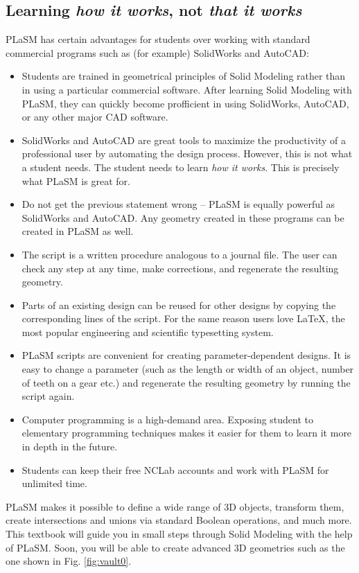 \documentclass{article}
\begin{document}
\subsection{Learning {\em how it works}, not {\em that it works}}
PLaSM has certain advantages for students over 
working with standard commercial programs such as (for example) 
SolidWorks and AutoCAD:

\begin{itemize}
\item Students are trained in geometrical principles of Solid Modeling rather 
      than in using a particular commercial software. After learning Solid 
      Modeling with PLaSM, they can quickly become profficient in using SolidWorks, 
      AutoCAD, or any other major CAD software.
\item SolidWorks and AutoCAD are great tools to maximize the productivity 
      of a professional user by automating the design process. However, this is not what a student needs. 
      The student needs to learn {\em how it works}. This is precisely what PLaSM is great for.
\item Do not get the previous statement wrong -- PLaSM is equally powerful as SolidWorks and AutoCAD. Any geometry 
      created in these programs can be created in PLaSM as well. 
\item The script is a written procedure analogous to a journal file. The user can 
      check any step at any time, make corrections, and regenerate the resulting 
      geometry.
\item Parts of an existing design can be reused for other designs by copying the 
      corresponding lines of the script. For the same reason users love \LaTeX, 
      the most popular engineering and scientific typesetting system. 
\item PLaSM scripts are convenient for creating parameter-dependent designs. It is 
      easy to change a parameter (such as the length or width of an object, number of 
      teeth on a gear etc.) and regenerate the resulting geometry by running the 
      script again.
\item Computer programming is a high-demand area. Exposing student to elementary 
      programming techniques makes it easier for them to learn it more in depth 
      in the future. 
\item Students can keep their free NCLab accounts and work with PLaSM 
      for unlimited time.
\end{itemize}
PLaSM makes it possible to define a wide range of 3D objects, transform 
them, create intersections and unions via standard Boolean operations, and much 
more. This textbook will guide you in small steps 
through Solid Modeling with the help of PLaSM. Soon, you will be able to create 
advanced 3D geometries such as the one shown in Fig. \ref{fig:vault0}.
\newpage
\end{document}
